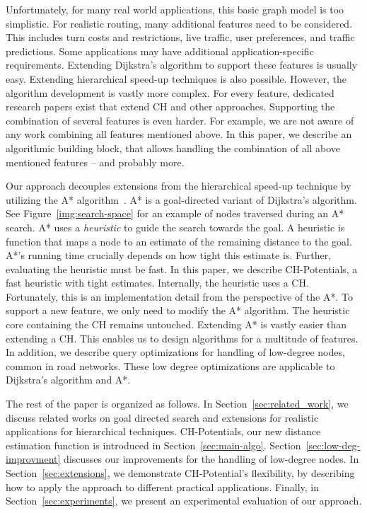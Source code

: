 \documentclass[manuscript,review]{acmart}
\begin{document}
Unfortunately, for many real world applications, this basic graph model is too simplistic.
For realistic routing, many additional features need to be considered.
This includes turn costs and restrictions, live traffic, user preferences, and traffic predictions. %
Some applications may have additional application-specific requirements.
Extending Dijkstra's algorithm to support these features is usually easy.
Extending hierarchical speed-up techniques is also possible.
However, the algorithm development is vastly more complex.
For every feature, dedicated research papers exist that extend CH and other approaches.
Supporting the combination of several features is even harder.
For example, we are not aware of any work combining all features mentioned above.
In this paper, we describe an algorithmic building block, that allows handling the combination of all above mentioned features -- and probably more.

Our approach decouples extensions from the hierarchical speed-up technique by utilizing the A* algorithm~\cite{hnr-afbhd-68}.
A* is a goal-directed variant of Dijkstra's algorithm.
See Figure~\ref{img:search-space} for an example of nodes traversed during an A* search.
A* uses a \emph{heuristic} to guide the search towards the goal.
A heuristic is function that maps a node to an estimate of the remaining distance to the goal.
A*'s running time crucially depends on how tight this estimate is.
Further, evaluating the heuristic must be fast.
In this paper, we describe CH-Potentials, a fast heuristic with tight estimates.
Internally, the heuristic uses a CH.
Fortunately, this is an implementation detail from the perspective of the A*.
To support a new feature, we only need to modify the A* algorithm.
The heuristic core containing the CH remains untouched.
Extending A* is vastly easier than extending a CH.
This enables us to design algorithms for a multitude of features.
In addition, we describe query optimizations for handling of low-degree nodes, common in road networks.
These low degree optimizations are applicable to Dijkstra's algorithm and A*.

The rest of the paper is organized as follows.
In Section~\ref{sec:related_work}, we discuss related works on goal directed search and extensions for realistic applications for hierarchical techniques.
CH-Potentials, our new distance estimation function is introduced in Section~\ref{sec:main-algo}.
Section~\ref{sec:low-deg-improvment} discusses our improvements for the handling of low-degree nodes.
In Section~\ref{sec:extensions}, we demonstrate CH-Potential's flexibility, by describing how to apply the approach to different practical applications.
Finally, in Section~\ref{sec:experiments}, we present an experimental evaluation of our approach.
\end{document}

